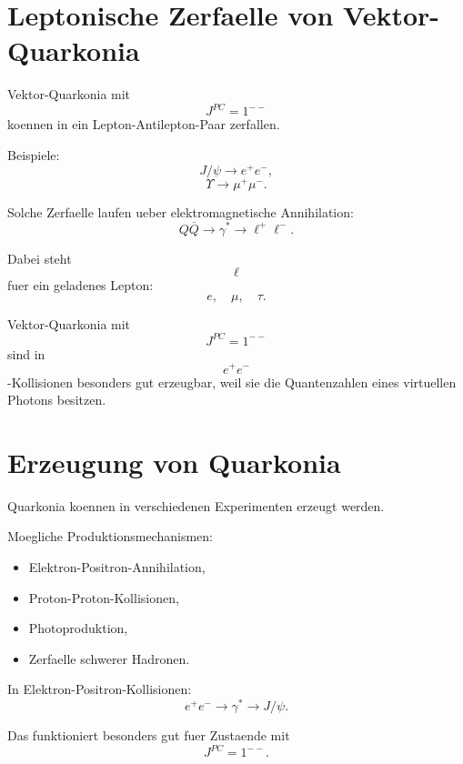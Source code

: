 \section{Leptonische Zerfaelle von Vektor-Quarkonia}

Vektor-Quarkonia mit
\[
    J^{PC}=1^{--}
\]
koennen in ein Lepton-Antilepton-Paar zerfallen.

\begin{formulabox}
Beispiele:
\[
    J/\psi \rightarrow e^+e^-,
\]
\[
    \Upsilon \rightarrow \mu^+\mu^-.
\]
\end{formulabox}

\begin{conceptbox}
Solche Zerfaelle laufen ueber elektromagnetische Annihilation:
\[
    Q\overline{Q}
    \rightarrow
    \gamma^*
    \rightarrow
    \ell^+\ell^-.
\]

Dabei steht
\[
    \ell
\]
fuer ein geladenes Lepton:
\[
    e,\quad \mu,\quad \tau.
\]
\end{conceptbox}

\begin{examtipbox}
Vektor-Quarkonia mit
\[
    J^{PC}=1^{--}
\]
sind in
\[
    e^+e^-
\]
-Kollisionen besonders gut erzeugbar, weil sie die Quantenzahlen eines virtuellen
Photons besitzen.
\end{examtipbox}

\section{Erzeugung von Quarkonia}

Quarkonia koennen in verschiedenen Experimenten erzeugt werden.

\begin{conceptbox}
Moegliche Produktionsmechanismen:
\begin{itemize}
    \item Elektron-Positron-Annihilation,
    \item Proton-Proton-Kollisionen,
    \item Photoproduktion,
    \item Zerfaelle schwerer Hadronen.
\end{itemize}
\end{conceptbox}

\begin{examplebox}
In Elektron-Positron-Kollisionen:
\[
    e^+e^- \rightarrow \gamma^* \rightarrow J/\psi.
\]

Das funktioniert besonders gut fuer Zustaende mit
\[
    J^{PC}=1^{--}.
\]
\end{examplebox}

